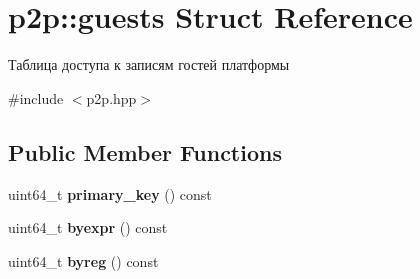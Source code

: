 \hypertarget{structp2p_1_1guests}{}\section{p2p\+:\+:guests Struct Reference}
\label{structp2p_1_1guests}


Таблица доступа к записям гостей платформы  




{\ttfamily \#include $<$p2p.\+hpp$>$}

\subsection*{Public Member Functions}
\begin{DoxyCompactItemize}
\item 
\mbox{\label{structp2p_1_1guests_a7ea0e0b2c54e710ecda2895b9ba1d4c9}} 
uint64\+\_\+t {\bfseries primary\+\_\+key} () const
\item 
\mbox{\label{structp2p_1_1guests_ab0bd423df57e4e4cb8c037f3b8d19975}} 
uint64\+\_\+t {\bfseries byexpr} () const
\item 
\mbox{\label{structp2p_1_1guests_ae7c6e94ea3fb3000bca7512ff94b9d4d}} 
uint64\+\_\+t {\bfseries byreg} () const
\end{DoxyCompactItemize}
